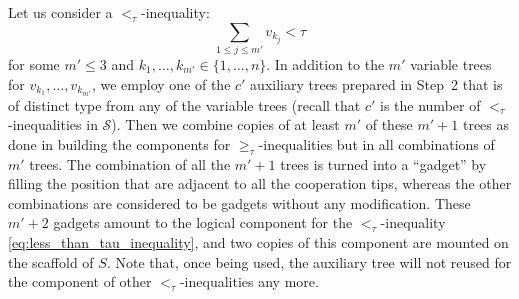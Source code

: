 \documentclass{article}
\theoremstyle{remark}
\theoremstyle{definition}
\begin{document}
Let us consider a $<_\tau$-inequality:
\begin{equation}\label{eq:less_than_tau_inequality}
	\sum_{1 \le j \le m'} v_{k_j} < \tau 
\end{equation}
for some $m' \le 3$ and $k_1, \ldots, k_{m'} \in \{1, \ldots, n\}$. 
In addition to the $m'$ variable trees for $v_{k_1}, \ldots, v_{k_{m'}}$, we employ one of the $c'$ auxiliary trees prepared in Step~2 that is of distinct type from any of the variable trees (recall that $c'$ is the number of $<_\tau$-inequalities in $\mathcal{S}$). 
Then we combine copies of at least $m'$ of these $m'+1$ trees as done in building the components for $\ge_\tau$-inequalities but in all combinations of $m'$ trees. 
The combination of all the $m'+1$ trees is turned into a ``gadget'' by filling the position that are adjacent to all the cooperation tips, whereas the other combinations are considered to be gadgets without any modification. 
These $m'+2$ gadgets amount to the logical component for the $<_\tau$-inequality \eqref{eq:less_than_tau_inequality}, and two copies of this component are mounted on the scaffold of $S$. 
Note that, once being used, the auxiliary tree will not reused for the component of other $<_\tau$-inequalities any more. 
\end{document}
